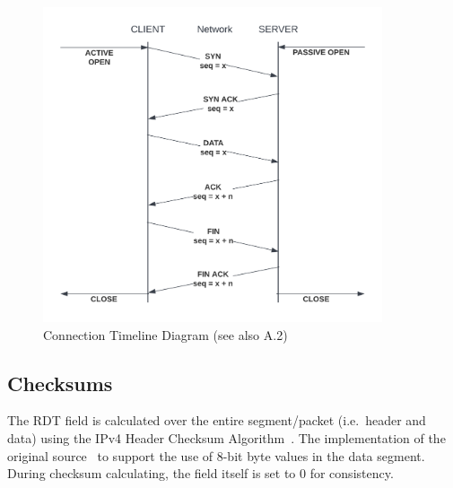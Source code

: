 \begin{figure}[h]
\begin{center}
    \includegraphics[width=100mm]{images/timeline.png}
\end{center}
\caption{Connection Timeline Diagram (see also A.2)}\label{fig:timeline}
\end{figure} 


\subsection{Checksums}
The RDT  field is calculated over the entire segment/packet (i.e.~header and data) using the IPv4 Header Checksum Algorithm~\cite{rfc791}. The implementation of the original source~\cite{ipv4_checksum} to support the use of 8-bit byte values in the data segment. During checksum calculating, the  field itself is set to 0 for consistency.